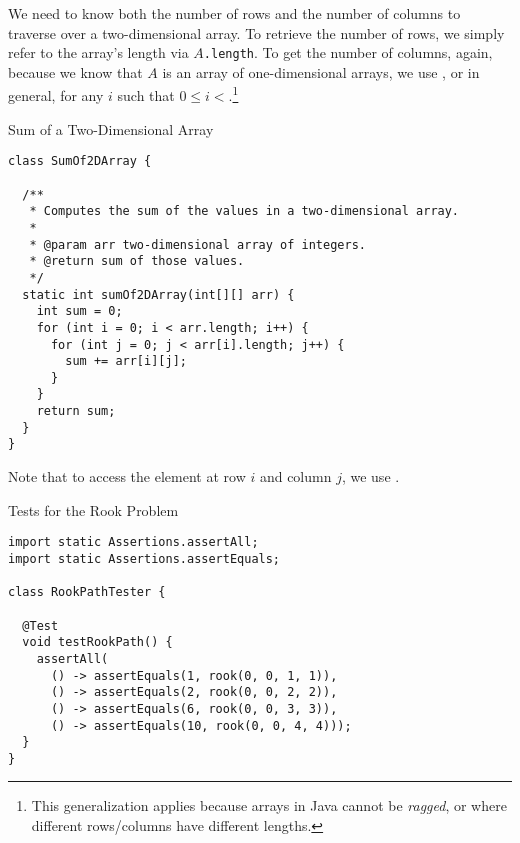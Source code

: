 We need to know both the number of rows and the number of columns to traverse over a two-dimensional array. To retrieve the number of rows, we simply refer to the array's length via \texttt{$A$.length}. To get the number of columns, again, because we know that $A$ is an array of one-dimensional arrays, we use , or in general,  for any $i$ such that $0 \leq i < $.\footnote{This generalization applies because arrays in Java cannot be \textit{ragged}, or where different rows/columns have different lengths.}

\begin{cl}{Sum of a Two-Dimensional Array}
\begin{lstlisting}[language=MyJava]
class SumOf2DArray {

  /**
   * Computes the sum of the values in a two-dimensional array.
   *
   * @param arr two-dimensional array of integers.
   * @return sum of those values.
   */
  static int sumOf2DArray(int[][] arr) {
    int sum = 0;
    for (int i = 0; i < arr.length; i++) {
      for (int j = 0; j < arr[i].length; j++) {
        sum += arr[i][j];
      }
    }
    return sum;
  }
}
\end{lstlisting}
\end{cl}

Note that to access the element at row $i$ and column $j$, we use . 


\begin{cl}{Tests for the Rook Problem}
\begin{lstlisting}[language=MyJava]
import static Assertions.assertAll;
import static Assertions.assertEquals;

class RookPathTester {

  @Test
  void testRookPath() {
    assertAll(
      () -> assertEquals(1, rook(0, 0, 1, 1)),
      () -> assertEquals(2, rook(0, 0, 2, 2)),
      () -> assertEquals(6, rook(0, 0, 3, 3)),
      () -> assertEquals(10, rook(0, 0, 4, 4)));
  }
}
\end{lstlisting}
\end{cl}

